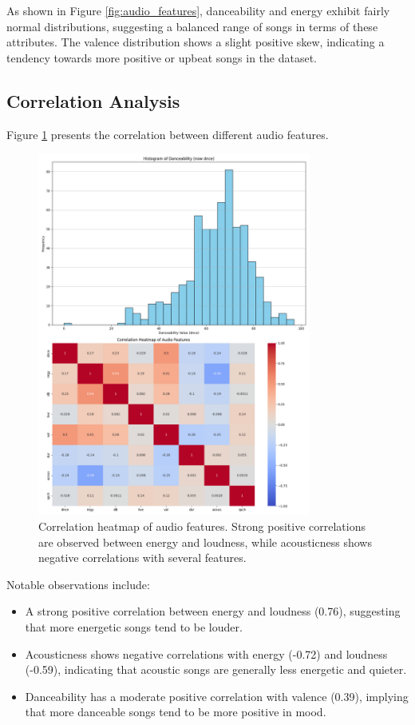 \documentclass[runningheads]{llncs}
\begin{document}
As shown in Figure \ref{fig:audio_features}, danceability and energy exhibit fairly normal distributions, suggesting a balanced range of songs in terms of these attributes. The valence distribution shows a slight positive skew, indicating a tendency towards more positive or upbeat songs in the dataset.

\subsection{Correlation Analysis}

Figure \ref{fig:correlation} presents the correlation between different audio features.

\begin{figure}[h]
    \centering
    \includegraphics[width=0.8\textwidth]{correlation_heatmap.png} %
    \caption{Correlation heatmap of audio features. Strong positive correlations are observed between energy and loudness, while acousticness shows negative correlations with several features.}
    \label{fig:correlation}
\end{figure}

Notable observations include:

\begin{itemize}
    \item A strong positive correlation between energy and loudness (0.76), suggesting that more energetic songs tend to be louder.
    \item Acousticness shows negative correlations with energy (-0.72) and loudness (-0.59), indicating that acoustic songs are generally less energetic and quieter.
    \item Danceability has a moderate positive correlation with valence (0.39), implying that more danceable songs tend to be more positive in mood.
\end{itemize}
\end{document}
